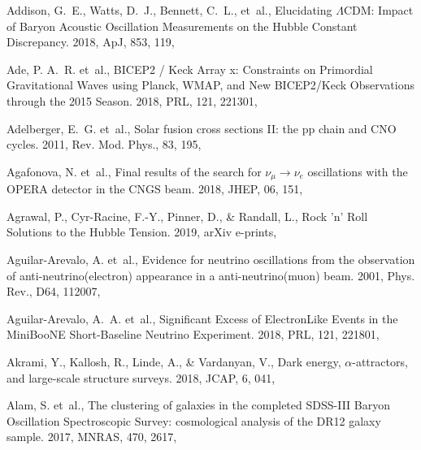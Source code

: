 \documentclass[longauth,traditabstract]{aa}
\def\apj{{ApJ}}
\def\mnras{{MNRAS}}
\def\prl{{PRL}}
\def\jcap{{JCAP}}
\begin{document}
\begin{thebibliography}{379}
{Addison}, G.~E., {Watts}, D.~J., {Bennett}, C.~L., {et~al.}, {Elucidating
  {$\Lambda$}CDM: Impact of Baryon Acoustic Oscillation Measurements on the
  Hubble Constant Discrepancy}. 2018, \apj, 853, 119, 

Ade, P. A.~R. {et~al.}, {BICEP2 / Keck Array x: Constraints on Primordial
  Gravitational Waves using Planck, WMAP, and New BICEP2/Keck Observations
  through the 2015 Season}. 2018, \prl, 121, 221301, 

Adelberger, E.~G. {et~al.}, {Solar fusion cross sections II: the pp chain and
  CNO cycles}. 2011, Rev. Mod. Phys., 83, 195, 

Agafonova, N. {et~al.}, {Final results of the search for $\nu_{\mu} \to
  \nu_{e}$ oscillations with the OPERA detector in the CNGS beam}. 2018, JHEP,
  06, 151, 

Agrawal, P., Cyr-Racine, F.-Y., Pinner, D., \& Randall, L., {Rock 'n' Roll
  Solutions to the Hubble Tension}. 2019, arXiv e-prints, 

Aguilar-Arevalo, A. {et~al.}, {Evidence for neutrino oscillations from the
  observation of anti-neutrino(electron) appearance in a anti-neutrino(muon)
  beam}. 2001, Phys. Rev., D64, 112007, 

Aguilar-Arevalo, A.~A. {et~al.}, {Significant Excess of ElectronLike Events in
  the MiniBooNE Short-Baseline Neutrino Experiment}. 2018, \prl, 121, 221801,

{Akrami}, Y., {Kallosh}, R., {Linde}, A., \& {Vardanyan}, V., {Dark energy,
  {$\alpha$}-attractors, and large-scale structure surveys}. 2018, \jcap, 6,
  041, 

Alam, S. {et~al.}, {The clustering of galaxies in the completed SDSS-III Baryon
  Oscillation Spectroscopic Survey: cosmological analysis of the DR12 galaxy
  sample}. 2017, \mnras, 470, 2617, 


\end{thebibliography}
\end{document}
